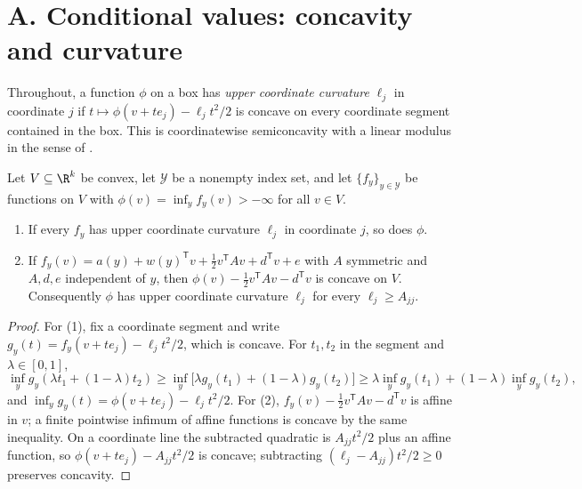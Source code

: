 %

\section*{A. Conditional values: concavity and curvature}

Throughout, a function $\phi$ on a box has \emph{upper coordinate curvature} $\ell_j$ in
coordinate $j$ if $t\mapsto\phi(v+te_j)-\ell_jt^2/2$ is concave on every coordinate segment
contained in the box. This is coordinatewise semiconcavity with a linear modulus in the sense
of \cite{CannarsaSinestrari2004}.

\begin{lemma}\label{lit:lem:inf}
Let $V\subseteq\R^k$ be convex, let $\mathcal Y$ be a nonempty index set, and let
$\{f_y\}_{y\in\mathcal Y}$ be functions on $V$ with $\phi(v)=\inf_{y}f_y(v)>-\infty$ for all
$v\in V$.
\begin{enumerate}
\item If every $f_y$ has upper coordinate curvature $\ell_j$ in coordinate $j$, so does $\phi$.
\item If $f_y(v)=a(y)+w(y)^{\mathsf T}v+\tfrac12v^{\mathsf T}Av+d^{\mathsf T}v+e$ with $A$
symmetric and $A,d,e$ independent of $y$, then $\phi(v)-\tfrac12v^{\mathsf T}Av-d^{\mathsf T}v$
is concave on $V$. Consequently $\phi$ has upper coordinate curvature $\ell_j$ for every
$\ell_j\ge A_{jj}$.
\end{enumerate}
\end{lemma}

\begin{proof}
For (1), fix a coordinate segment and write $g_y(t)=f_y(v+te_j)-\ell_jt^2/2$, which is concave.
For $t_1,t_2$ in the segment and $\lambda\in[0,1]$,
\[
\inf_y g_y(\lambda t_1+(1-\lambda)t_2)\ge\inf_y\bigl[\lambda g_y(t_1)+(1-\lambda)g_y(t_2)\bigr]
\ge\lambda\inf_y g_y(t_1)+(1-\lambda)\inf_y g_y(t_2),
\]
and $\inf_yg_y(t)=\phi(v+te_j)-\ell_jt^2/2$. For (2), $f_y(v)-\tfrac12v^{\mathsf T}Av-d^{\mathsf T}v$
is affine in $v$; a finite pointwise infimum of affine functions is concave by the same
inequality. On a coordinate line the subtracted quadratic is $A_{jj}t^2/2$ plus an affine
function, so $\phi(v+te_j)-A_{jj}t^2/2$ is concave; subtracting $(\ell_j-A_{jj})t^2/2\ge0$ preserves
concavity.
\end{proof}

